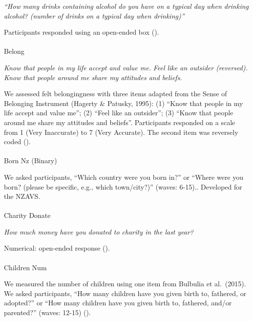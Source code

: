 \documentclass[
  single column]{article}
\makeatletter
\let\oldparagraph\paragraph
\renewcommand{\paragraph}{
    \@ifstar
      \xxxParagraphStar
      \xxxParagraphNoStar
  }
\newcommand{\xxxParagraphStar}[1]{\oldparagraph*{#1}\mbox{}}
\newcommand{\xxxParagraphNoStar}[1]{\oldparagraph{#1}\mbox{}}
\makeatother
\begin{document}
\emph{``How many drinks containing alcohol do you have on a typical day
when drinking alcohol? (number of drinks on a typical day when
drinking)''}

Participants responded using an open-ended box
().

\paragraph{Belong}\label{belong}

\emph{Know that people in my life accept and value me.} \emph{Feel like
an outsider (reversed).} \emph{Know that people around me share my
attitudes and beliefs.}

We assessed felt belongingness with three items adapted from the Sense
of Belonging Instrument (Hagerty \& Patusky, 1995): (1) ``Know that
people in my life accept and value me''; (2) ``Feel like an outsider'';
(3) ``Know that people around me share my attitudes and beliefs''.
Participants responded on a scale from 1 (Very Inaccurate) to 7 (Very
Accurate). The second item was reversely coded
().

\paragraph{Born Nz (Binary)}\label{born-nz-binary}

We asked participants, ``Which country were you born in?'' or ``Where
were you born? (please be specific, e.g., which town/city?)'' (waves:
6-15).. Developed for the NZAVS.

\paragraph{Charity Donate}\label{charity-donate}

\emph{How much money have you donated to charity in the last year?}

Numerical: open-ended response
().

\paragraph{Children Num}\label{children-num}

We measured the number of children using one item from Bulbulia et
al.~(2015). We asked participants, ``How many children have you given
birth to, fathered, or adopted?'' or ``How many children have you given
birth to, fathered, and/or parented?'' (waves: 12-15)
().
\end{document}

